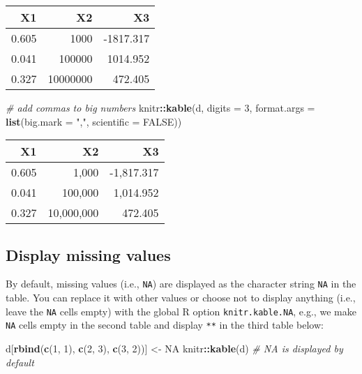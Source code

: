 \documentclass[
  11pt,
]{krantz}
\newenvironment{Shaded}{\begin{snugshade}}{\end{snugshade}}
\newcommand{\CommentTok}[1]{\textcolor[rgb]{0.37,0.37,0.37}{\textit{#1}}}
\newcommand{\DataTypeTok}[1]{\textcolor[rgb]{0.27,0.27,0.27}{#1}}
\newcommand{\DecValTok}[1]{\textcolor[rgb]{0.06,0.06,0.06}{#1}}
\newcommand{\KeywordTok}[1]{\textcolor[rgb]{0.27,0.27,0.27}{\textbf{#1}}}
\newcommand{\NormalTok}[1]{#1}
\newcommand{\OperatorTok}[1]{\textcolor[rgb]{0.43,0.43,0.43}{\textbf{#1}}}
\newcommand{\OtherTok}[1]{\textcolor[rgb]{0.37,0.37,0.37}{#1}}
\newcommand{\StringTok}[1]{\textcolor[rgb]{0.5,0.5,0.5}{#1}}
\begin{document}
\begin{tabular}{r|r|r}
\hline
X1 & X2 & X3\\
\hline
0.605 & 1000 & -1817.317\\
\hline
0.041 & 100000 & 1014.952\\
\hline
0.327 & 10000000 & 472.405\\
\hline
\end{tabular}

\begin{Shaded}
\begin{Highlighting}[]
\CommentTok{# add commas to big numbers}
\NormalTok{knitr}\OperatorTok{::}\KeywordTok{kable}\NormalTok{(d, }\DataTypeTok{digits =} \DecValTok{3}\NormalTok{, }\DataTypeTok{format.args =} \KeywordTok{list}\NormalTok{(}\DataTypeTok{big.mark =} \StringTok{","}\NormalTok{, }\DataTypeTok{scientific =} \OtherTok{FALSE}\NormalTok{))}
\end{Highlighting}
\end{Shaded}

\begin{tabular}{r|r|r}
\hline
X1 & X2 & X3\\
\hline
0.605 & 1,000 & -1,817.317\\
\hline
0.041 & 100,000 & 1,014.952\\
\hline
0.327 & 10,000,000 & 472.405\\
\hline
\end{tabular}

\hypertarget{display-missing-values}{%
\subsection{Display missing values}\label{display-missing-values}}

By default, missing values (i.e., \texttt{NA}) are displayed as the character string \texttt{NA} in the table. You can replace it with other values or choose not to display anything (i.e., leave the \texttt{NA} cells empty) with the global R option \texttt{knitr.kable.NA}, e.g., we make \texttt{NA} cells empty in the second table and display \texttt{**} in the third table below:

\begin{Shaded}
\begin{Highlighting}[]
\NormalTok{d[}\KeywordTok{rbind}\NormalTok{(}\KeywordTok{c}\NormalTok{(}\DecValTok{1}\NormalTok{, }\DecValTok{1}\NormalTok{), }\KeywordTok{c}\NormalTok{(}\DecValTok{2}\NormalTok{, }\DecValTok{3}\NormalTok{), }\KeywordTok{c}\NormalTok{(}\DecValTok{3}\NormalTok{, }\DecValTok{2}\NormalTok{))] <-}\StringTok{ }\OtherTok{NA}
\NormalTok{knitr}\OperatorTok{::}\KeywordTok{kable}\NormalTok{(d)  }\CommentTok{# NA is displayed by default}
\end{Highlighting}
\end{Shaded}
\end{document}
